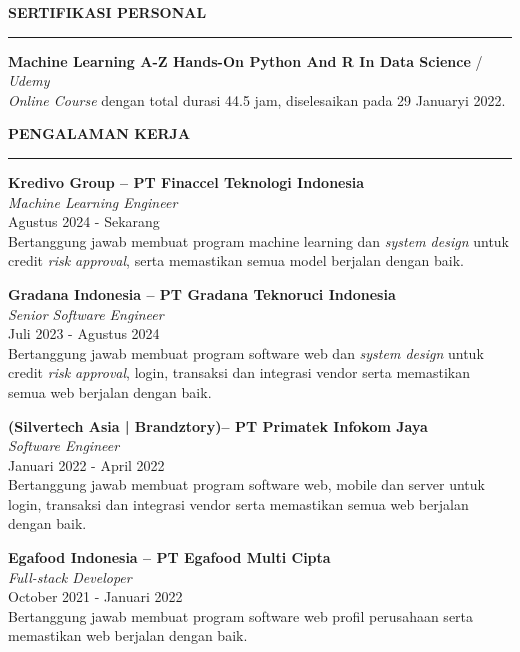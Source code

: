 \documentclass[12pt,a4paper]{article}
\begin{document}
\vspace{0.5cm}
\textbf{SERTIFIKASI PERSONAL}
\vspace{0.2cm}
\hrule
\vspace{0.4cm}

\textbf{Machine Learning A-Z Hands-On Python And R In Data Science} / \textit{Udemy} \\
\textit{Online Course} dengan total durasi 44.5 jam, diselesaikan pada 29 Januaryi 2022.

\vspace{2cm}

\vspace{0.5cm}
\textbf{PENGALAMAN KERJA}
\vspace{0.2cm}
\hrule
\vspace{0.4cm}

\textbf{Kredivo Group -- PT Finaccel Teknologi Indonesia} \\
\textit{Machine Learning Engineer} \\
Agustus 2024 - Sekarang \\
Bertanggung jawab membuat program machine learning dan \textit{system design} untuk credit \textit{risk approval}, serta memastikan semua model berjalan dengan baik.
\vspace{0.3cm}

\textbf{Gradana Indonesia -- PT Gradana Teknoruci Indonesia} \\
\textit{Senior Software Engineer} \\
Juli 2023 - Agustus 2024 \\
Bertanggung jawab membuat program software web dan \textit{system design} untuk credit \textit{risk approval}, login, transaksi dan integrasi vendor serta memastikan semua web berjalan dengan baik.
\vspace{0.3cm}

\textbf{(Silvertech Asia | Brandztory)-- PT Primatek Infokom Jaya} \\
\textit{Software Engineer} \\
Januari 2022 - April 2022 \\
Bertanggung jawab membuat program software web, mobile dan server untuk login, transaksi dan integrasi vendor serta memastikan semua web berjalan dengan baik.
\vspace{0.3cm}

\textbf{Egafood Indonesia -- PT Egafood Multi Cipta} \\
\textit{Full-stack Developer} \\
October 2021 - Januari 2022 \\
Bertanggung jawab membuat program software web profil perusahaan serta memastikan web berjalan dengan baik.
\vspace{0.3cm}
\end{document}

